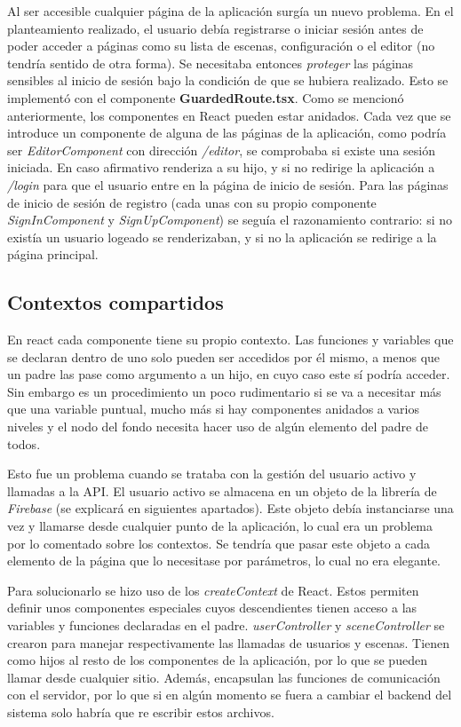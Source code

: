 Al ser accesible cualquier página de la aplicación surgía un nuevo problema. En el planteamiento realizado, el usuario debía registrarse o iniciar sesión antes de poder acceder a páginas como su lista de escenas, configuración o el editor (no tendría sentido de otra forma). Se necesitaba entonces \textit{proteger} las páginas sensibles al inicio de sesión bajo la condición de que se hubiera realizado. Esto se implementó con el componente \textbf{GuardedRoute.tsx}. Como se mencionó anteriormente, los componentes en React pueden estar anidados. Cada vez que se introduce un componente de alguna de las páginas de la aplicación, como podría ser \textit{EditorComponent} con dirección \textit{/editor}, se comprobaba si existe una sesión iniciada. En caso afirmativo renderiza a su hijo, y si no redirige la aplicación a \textit{/login} para que el usuario entre en la página de inicio de sesión. Para las páginas de inicio de sesión de registro (cada unas con su propio componente \textit{SignInComponent} y \textit{SignUpComponent}) se seguía el razonamiento contrario: si no existía un usuario logeado se renderizaban, y si no la aplicación se redirige a la página principal.

\subsection{Contextos compartidos}

En react cada componente tiene su propio contexto. Las funciones y variables que se declaran dentro de uno solo pueden ser accedidos por él mismo, a menos que un padre las pase como argumento a un hijo, en cuyo caso este sí  podría acceder. Sin embargo es un procedimiento un poco rudimentario si se va a necesitar más que una variable puntual, mucho más si hay componentes anidados a varios niveles y el nodo del fondo necesita hacer uso de algún elemento del padre de todos.

Esto fue un problema cuando se trataba con la gestión del usuario activo y llamadas a la API. El usuario activo se almacena en un objeto de la librería de \textit{Firebase} (se explicará en siguientes apartados). Este objeto debía instanciarse una vez y llamarse desde cualquier punto de la aplicación, lo cual era un problema por lo comentado sobre los contextos. Se tendría que pasar este objeto a cada elemento de la página que lo necesitase por parámetros, lo cual no era elegante.

Para solucionarlo se hizo uso de los \textit{createContext} de React. Estos permiten definir unos componentes especiales cuyos descendientes tienen acceso a las variables y funciones declaradas en el padre. \textit{userController} y \textit{sceneController} se crearon para manejar respectivamente las llamadas de usuarios y escenas. Tienen como hijos al resto de los componentes de la aplicación, por lo que se pueden llamar desde cualquier sitio. Además, encapsulan las funciones de comunicación con el servidor, por lo que si en algún momento se fuera a cambiar el backend del sistema solo habría que re escribir estos archivos.

